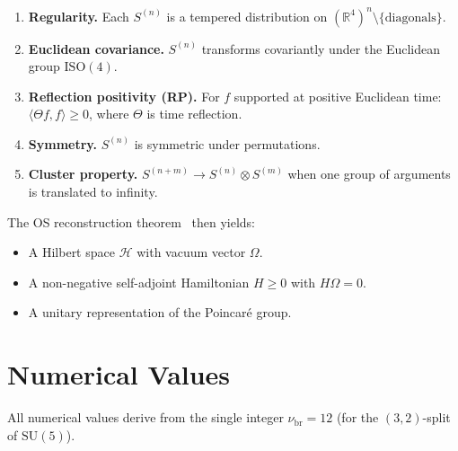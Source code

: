 \documentclass[12pt]{article}
\theoremstyle{plain}
\theoremstyle{definition}
\numberwithin{equation}{section}
\newcommand{\R}{\mathbb{R}}
\newcommand{\br}{\mathrm{br}}
\begin{document}
\begin{enumerate}[label=(OS\arabic*)]
\item \textbf{Regularity.}  Each $S^{(n)}$ is a tempered distribution on $(\R^4)^n\setminus\{\text{diagonals}\}$.

\item \textbf{Euclidean covariance.}  $S^{(n)}$ transforms covariantly under the Euclidean group $\mathrm{ISO}(4)$.

\item \textbf{Reflection positivity (RP).}  For $f$ supported at positive Euclidean time: $\langle\Theta f,f\rangle\geq 0$, where $\Theta$ is time reflection.

\item \textbf{Symmetry.}  $S^{(n)}$ is symmetric under permutations.

\item \textbf{Cluster property.}  $S^{(n+m)}\to S^{(n)}\otimes S^{(m)}$ when one group of arguments is translated to infinity.
\end{enumerate}

The OS reconstruction theorem~\cite{OsterwalderSchrader} then yields:
\begin{itemize}
\item A Hilbert space $\mathcal{H}$ with vacuum vector $\Omega$.
\item A non-negative self-adjoint Hamiltonian $H\geq 0$ with $H\Omega=0$.
\item A unitary representation of the Poincar\'e group.
\end{itemize}


\section{Numerical Values}\label{app:numerics}

All numerical values derive from the single integer $\nu_{\br}=12$ (for the $(3,2)$-split of $\mathrm{SU}(5)$).
\end{document}
